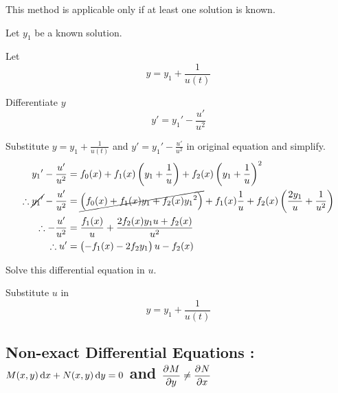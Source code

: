 \documentclass[fleqn, a4paper, 12pt, twoside]{article}
\theoremstyle{definition}
\theoremstyle{theorem}
\begin{document}
This method is applicable only if at least one solution is known.
\begin{algorithmic}[1]
	\item Let $y_1$ be a known solution.
	\item 
		Let
		\begin{equation*}
			y = y_1 + \frac{1}{u(t)}
		\end{equation*}
	\item 
		Differentiate $y$
		\begin{equation*}
			y' = {y_1}' - \frac{u'}{u^2}
		\end{equation*}
	\item 
		Substitute $y = y_1 + \frac{1}{u(t)}$ and $y' = {y_1}' - \frac{u'}{u^2}$ in original equation and simplify.
		\begin{align*}
			{y_1}' - \frac{u'}{u^2} &= f_0(x) + f_1(x) \left( y_1 + \frac{1}{u} \right) + f_2(x) \left( y_1 + \frac{1}{u} \right)^2\\
			\therefore \cancel{{y_1}'} - \frac{u'}{u^2} &= \cancel{\left( f_0(x) + f_1(x) y_1 + f_2(x) {y_1}^2\right)} + f_1(x) \frac{1}{u} + f_2(x) \left( \frac{2 y_1}{u} + \frac{1}{u^2} \right)\\
			\therefore -\frac{u'}{u^2} &= \frac{f_1(x)}{u} + \frac{2 f_2(x) y_1 u + f_2(x)}{u^2}\\
			\therefore u' &= \left( -f_1(x) - 2 f_2 y_1 \right) u - f_2(x)
		\end{align*}
	\item 
		Solve this differential equation in $u$.
	\item 
		Substitute $u$ in 
		\begin{equation*}
			y = y_1 + \frac{1}{u(t)}
		\end{equation*}
\end{algorithmic}

\subsection{Non-exact Differential Equations : $M(x,y) \dif x + N(x,y) \dif y = 0$ and $\dpd{M}{y} \neq \dpd{N}{x}$}
\end{document}
